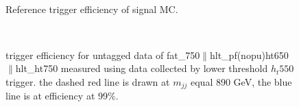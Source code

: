 \begin{figure}[htb]
\centering
      \\   
\caption[trigger efficiencies]{Reference trigger efficiency of signal MC.}
\label{fig:referencetrigger}
\end{figure}

\begin{figure}[htb]
\centering
      \\   
\caption[trigger efficiencies]{trigger efficiency for untagged data of fat\_750$\parallel$hlt\_pf(nopu)ht650$\parallel$hlt\_ht750 measured using data collected by lower threshold $h_t550$ trigger. the dashed red line is drawn at $m_{jj}$ equal 890 GeV, the blue line is at efficiency at 99$\%$. }
  \label{fig:trigger efficiencies part1}
\end{figure}

